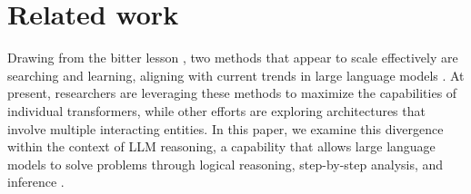 
\section{Related work}
\label{related_work}


Drawing from the bitter lesson \citep{sutton2019bitter}, two methods that appear to scale effectively are searching and learning, aligning with current trends in large language models \citep{xu2025towards}. At present, researchers are leveraging these methods to maximize the capabilities of individual transformers, while other efforts are exploring architectures that involve multiple interacting entities. In this paper, we examine this divergence within the context of LLM reasoning, a capability that allows large language models to solve problems through logical reasoning, step-by-step analysis, and inference \citep{wang2024openr}.

